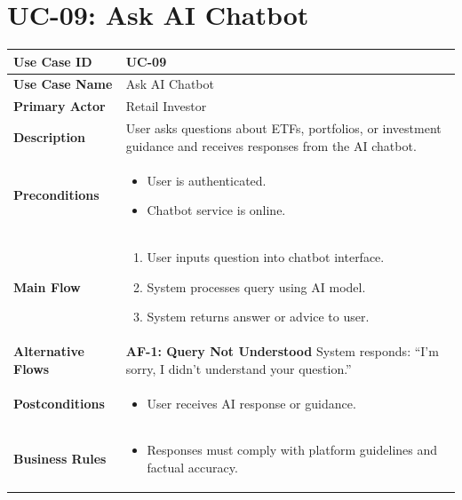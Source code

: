 \section{UC-09: Ask AI Chatbot}
\label{uc:chatbot}

\begin{longtable}{|>{\raggedright\arraybackslash\bfseries}p{3.5cm}|p{11cm}|}
\hline
\rowcolor{gray!15} Use Case ID & UC-09 \\ \hline
Use Case Name & Ask AI Chatbot \\ \hline
Primary Actor & Retail Investor \\ \hline
Description & User asks questions about ETFs, portfolios, or investment guidance and receives responses from the AI chatbot. \\ \hline
Preconditions &
\begin{itemize}[leftmargin=*, nosep]
    \item User is authenticated.
    \item Chatbot service is online.
\end{itemize} \\ \hline
Main Flow &
\begin{enumerate}[leftmargin=*, nosep]
    \item User inputs question into chatbot interface.
    \item System processes query using AI model.
    \item System returns answer or advice to user.
\end{enumerate} \\ \hline
Alternative Flows &
\textbf{AF-1: Query Not Understood} \newline
System responds: “I’m sorry, I didn’t understand your question.” \\ \hline
Postconditions &
\begin{itemize}[leftmargin=*, nosep]
    \item User receives AI response or guidance.
\end{itemize} \\ \hline
Business Rules &
\begin{itemize}[leftmargin=*, nosep]
    \item Responses must comply with platform guidelines and factual accuracy.
\end{itemize} \\ \hline
\end{longtable}

